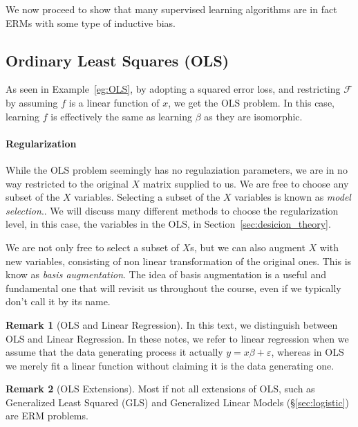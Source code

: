 \documentclass[12pt,a4paper]{article}
\theoremstyle{plain}
\theoremstyle{definition}
\newtheorem{remark}{Remark}
\newcommand{\hyp}{f}
\newcommand{\hypclass}{\mathcal{F}}
\begin{document}
We now proceed to show that many supervised learning algorithms are in fact ERMs with some type of inductive bias.

\subsection{Ordinary Least Squares (OLS)}
\label{sec:ols}
As seen in Example~\ref{eg:OLS}, by adopting a squared error loss, and restricting $\hypclass$ by assuming $\hyp$ is a linear function of $x$, we get the OLS problem.
In this case, learning $\hyp$ is effectively the same as learning $\beta$ as they are isomorphic.

\paragraph{Regularization}
While the OLS problem seemingly has no regulaziation parameters, we are in no way restricted to the original $X$ matrix supplied to us. 
We are free to choose any subset of the $X$ variables. Selecting a subset of the $X$ variables is known as \emph{model selection}..
We will discuss many different methods to choose the regularization level, in this case, the variables in the OLS, in Section~\ref{sec:desicion_theory}.

We are not only free to select a subset of $X$s, but we can also augment $X$ with new variables, consisting of non linear transformation of the original ones. This is know as \emph{basis augmentation}. 
The idea of basis augmentation is a useful and fundamental one that will revisit us throughout the course, even if we typically don't call it by its name.

\begin{remark}[OLS and Linear Regression]
In this text, we distinguish between OLS and Linear Regression. In these notes, we refer to linear regression when we assume that the data generating process it actually $y=x\beta+\varepsilon$, whereas in OLS we merely fit a linear function without claiming it is the data generating one.
\end{remark}


\begin{remark}[OLS Extensions]
Most if not all extensions of OLS, such as Generalized Least Squared (GLS) and Generalized Linear Models (\S\ref{sec:logistic}) are ERM problems. 
\end{remark}
\end{document}
